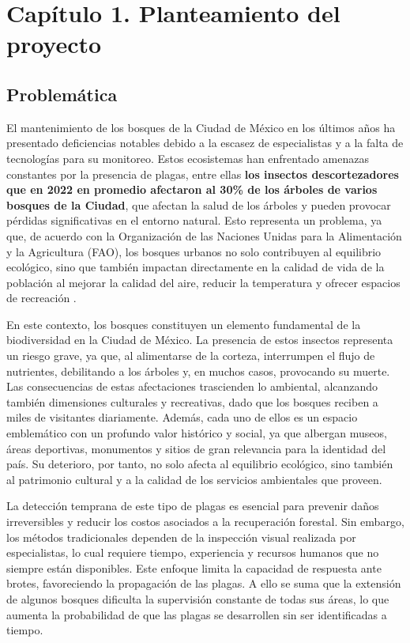 \newpage

\section*{Capítulo 1. Planteamiento del proyecto}
\setcounter{section}{1}
\setcounter{subsection}{0}

\subsection{Problemática}

El mantenimiento de los bosques de la Ciudad de México en los últimos años ha presentado deficiencias notables
debido a la escasez de especialistas y a la falta de tecnologías para su monitoreo. Estos ecosistemas han enfrentado
amenazas constantes por la presencia de plagas, entre ellas \textbf{los insectos descortezadores que en 2022 en promedio
afectaron al 30\% de los árboles de varios bosques de la Ciudad}, que afectan la salud de los árboles y pueden
provocar pérdidas significativas en el entorno natural. Esto representa un problema, ya que, de acuerdo con la
Organización de las Naciones Unidas para la Alimentación y la Agricultura (FAO), los bosques urbanos no solo
contribuyen al equilibrio ecológico, sino que también impactan directamente en la calidad de vida de la población al
mejorar la calidad del aire, reducir la temperatura y ofrecer espacios de recreación \cite{forestal2025bosques}.


En este contexto, los bosques constituyen un elemento fundamental de la biodiversidad en la Ciudad de México. La
presencia de estos insectos representa un riesgo grave, ya que, al alimentarse de la corteza, interrumpen el flujo de
nutrientes, debilitando a los árboles y, en muchos casos, provocando su muerte. Las consecuencias de estas
afectaciones trascienden lo ambiental, alcanzando también dimensiones culturales y recreativas, dado que los bosques
reciben a miles de visitantes diariamente. Además, cada uno de ellos es un espacio emblemático con un profundo valor
histórico y social, ya que albergan museos, áreas deportivas, monumentos y sitios de gran relevancia para la identidad
del país. Su deterioro, por tanto, no solo afecta al equilibrio ecológico, sino también al patrimonio cultural y a la
calidad de los servicios ambientales que proveen.


La detección temprana de este tipo de plagas es esencial para prevenir daños irreversibles y reducir los costos
asociados a la recuperación forestal. Sin embargo, los métodos tradicionales dependen de la inspección visual realizada
por especialistas, lo cual requiere tiempo, experiencia y recursos humanos que no siempre están disponibles. Este
enfoque limita la capacidad de respuesta ante brotes, favoreciendo la propagación de las plagas. A ello se suma que la
extensión de algunos bosques dificulta la supervisión constante de todas sus áreas, lo que aumenta la probabilidad de
que las plagas se desarrollen sin ser identificadas a tiempo.




